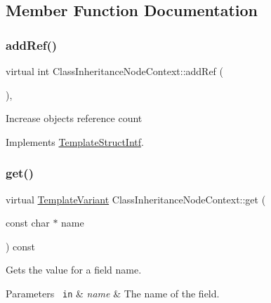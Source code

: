 \subsection{Member Function Documentation}
\mbox{\label{class_class_inheritance_node_context_a657382620f42bf8cf7119c647930c0ec}} 
\subsubsection{\texorpdfstring{addRef()}{addRef()}}
{\footnotesize\ttfamily virtual int Class\+Inheritance\+Node\+Context\+::add\+Ref (\begin{DoxyParamCaption}{ }\end{DoxyParamCaption})\hspace{0.3cm}{\ttfamily [inline]}, {\ttfamily [virtual]}}

Increase object\textquotesingle{}s reference count 

Implements \mbox{\hyperlink{class_template_struct_intf_a05fe97ad47633beb326f69686faed581}{Template\+Struct\+Intf}}.

\mbox{\label{class_class_inheritance_node_context_a7c30015b546f363391346c86fcf2c51d}} 
\subsubsection{\texorpdfstring{get()}{get()}}
{\footnotesize\ttfamily virtual \mbox{\hyperlink{class_template_variant}{Template\+Variant}} Class\+Inheritance\+Node\+Context\+::get (\begin{DoxyParamCaption}\item[{const char $\ast$}]{name }\end{DoxyParamCaption}) const\hspace{0.3cm}{\ttfamily [virtual]}}

Gets the value for a field name. 
\begin{DoxyParams}[1]{Parameters}
\mbox{\texttt{ in}}  & {\em name} & The name of the field. \\
\hline
\end{DoxyParams}


